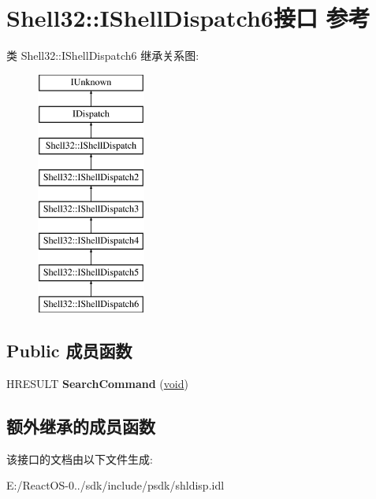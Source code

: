 \hypertarget{interface_shell32_1_1_i_shell_dispatch6}{}\section{Shell32\+:\+:I\+Shell\+Dispatch6接口 参考}
\label{interface_shell32_1_1_i_shell_dispatch6}
类 Shell32\+:\+:I\+Shell\+Dispatch6 继承关系图\+:\begin{figure}[H]
\begin{center}
\leavevmode
\includegraphics[height=8.000000cm]{interface_shell32_1_1_i_shell_dispatch6}
\end{center}
\end{figure}
\subsection*{Public 成员函数}
\begin{DoxyCompactItemize}
\item 
\mbox{\label{interface_shell32_1_1_i_shell_dispatch6_a148e9ddaed4fb3433a6ef7f18dde4d83}} 
H\+R\+E\+S\+U\+LT {\bfseries Search\+Command} (\hyperlink{interfacevoid}{void})
\end{DoxyCompactItemize}
\subsection*{额外继承的成员函数}


该接口的文档由以下文件生成\+:\begin{DoxyCompactItemize}
\item 
E\+:/\+React\+O\+S-\/0../sdk/include/psdk/shldisp.\+idl\end{DoxyCompactItemize}
